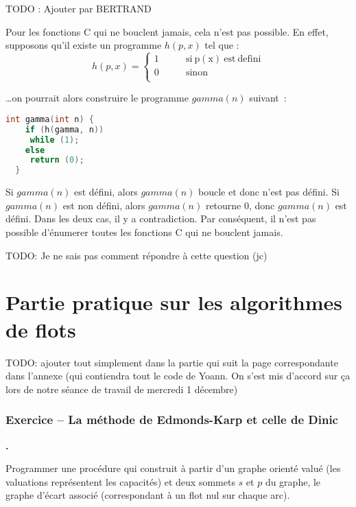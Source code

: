 \documentclass{article}
\newcounter{exocount}
\newcounter{enoncecount}
\newenvironment{enonce}
{
\stepcounter{enoncecount}
\bf\small \arabic{enoncecount}.
\begin{bf}
}
{
\end{bf}
}
\begin{document}
TODO : Ajouter par BERTRAND

Pour les fonctions C qui ne bouclent jamais, cela n'est pas possible. En effet, supposons qu'il existe un programme $h(p, x)$ tel que :
\[
h(p, x) = \left\{
\begin{array}{ll}
  1 & \qquad \mathrm{si}\ \mathrm{p(x)\ est\ defini} \\
  0 & \qquad \mathrm{sinon} \\
\end{array}
\right.
\]

\ldots on pourrait alors construire le programme $gamma(n)$ suivant~:
\begin{lstlisting}[language=C]
  int gamma(int n) {
    if (h(gamma, n))
     while (1);
    else
     return (0);
  }
\end{lstlisting}
Si $gamma(n)$ est défini, alors $gamma(n)$ boucle et donc n'est pas défini. Si $gamma(n)$ est non défini, alors $gamma(n)$ retourne 0, donc $gamma(n)$ est défini.
Dans les deux cas, il y a contradiction. Par conséquent, il n'est pas possible d'énumerer toutes les fonctions C qui ne bouclent jamais.

TODO: Je ne sais pas comment répondre à cette question (jc)

\section{Partie pratique sur les algorithmes de flots}

TODO: ajouter tout simplement dans la partie qui suit la page correspondante dans l'annexe (qui contiendra tout le code de Yoann. On s'est mis d'accord sur ça lors de notre séance de travail de mercredi 1 décembre)


\subsubsection*{Exercice \bf\small {} -- La méthode de Edmonds-Karp et celle de Dinic}
\setcounter{enoncecount}{0}

\begin{enonce}
Programmer une procédure qui construit à partir d'un graphe orienté valué (les valuations représentent les capacités) et deux sommets $s$ et $p$ du graphe, le graphe d'écart associé (correspondant à un flot nul sur chaque arc).
\end{enonce}
\end{document}
